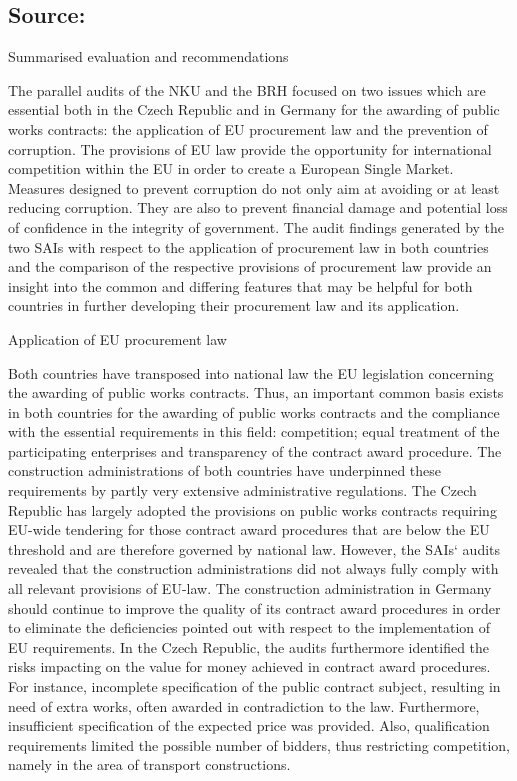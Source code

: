 \documentclass[10pt]{article}
\begin{document}
\subsection*{Source:}



Summarised evaluation and recommendations

The parallel audits of the NKU and the BRH focused on two issues which are essential both in the Czech Republic and in Germany for the awarding of public works contracts: the application of EU procurement law and the prevention of corruption.
The provisions of EU law provide the opportunity for international competition within the EU in order to create a European Single Market.
Measures designed to prevent corruption do not only aim at avoiding or at least reducing corruption. They are also to prevent financial damage and potential loss of confidence in the integrity of government.
The audit findings generated by the two SAIs with respect to the application of procurement law in both countries and the comparison of the respective provisions of procurement law provide an insight into the common and differing features that may be helpful for both countries in further developing their procurement law and its application.


Application of EU procurement law

Both countries have transposed into national law the EU legislation concerning the awarding of public works contracts.
Thus, an important common basis exists in both countries for the awarding of public works contracts and the compliance with the essential requirements in this field: competition; equal treatment of the participating enterprises and transparency of the contract award procedure.
The construction administrations of both countries have underpinned these requirements by partly very extensive administrative regulations.
The Czech Republic has largely adopted the provisions on public works contracts requiring EU-wide tendering for those contract award procedures that are below the EU threshold and are therefore governed by national law.
However, the SAIs‘ audits revealed that the construction administrations did not always fully comply with all relevant provisions of EU-law.
The construction administration in Germany should continue to improve the quality of its contract award procedures in order to eliminate the deficiencies pointed out with respect to the implementation of EU requirements.
In the Czech Republic, the audits furthermore identified the risks impacting on the value for money achieved in contract award procedures.
For instance, incomplete specification of the public contract subject, resulting in need of extra works, often awarded in contradiction to the law. Furthermore, insufficient specification of the expected price was provided. Also, qualification requirements limited the possible number of bidders, thus restricting competition, namely in the area of transport constructions.
\end{document}
